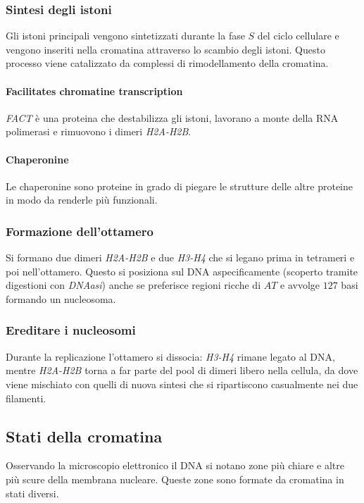 		\subsubsection{Sintesi degli istoni}
		Gli istoni principali vengono sintetizzati durante la fase $S$ del ciclo cellulare e vengono inseriti nella cromatina attraverso lo scambio degli istoni.
		Questo processo viene catalizzato da complessi di rimodellamento della cromatina.

			\paragraph{Facilitates chromatine transcription}
			\emph{FACT} \`e una proteina che destabilizza gli istoni, lavorano a monte della RNA polimerasi e rimuovono i dimeri \emph{H2A-H2B}.

			\paragraph{Chaperonine}
			Le chaperonine sono proteine in grado di piegare le strutture delle altre proteine in modo da renderle pi\`u funzionali.

		\subsubsection{Formazione dell'ottamero}
		Si formano due dimeri \emph{H2A-H2B} e due \emph{H3-H4} che si legano prima in tetrameri e poi nell'ottamero.
		Questo si posiziona sul DNA aspecificamente (scoperto tramite digestioni con \emph{DNAasi}) anche se preferisce regioni ricche di $AT$ e avvolge $127$ basi formando un nucleosoma.

		\subsubsection{Ereditare i nucleosomi}
		Durante la replicazione l'ottamero si dissocia: \emph{H3-H4} rimane legato al DNA, mentre \emph{H2A-H2B} torna a far parte del pool di dimeri libero nella cellula, da dove viene mischiato
		con quelli di nuova sintesi che si ripartiscono casualmente nei due filamenti.

	\subsection{Stati della cromatina}
	Osservando la microscopio elettronico il DNA si notano zone pi\`u chiare e altre pi\`u scure della membrana nucleare.
	Queste zone sono formate da cromatina in stati diversi.

